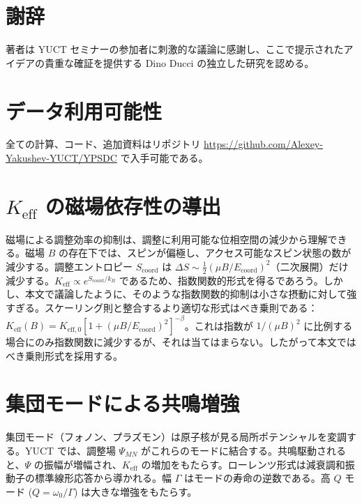 \documentclass[12pt]{article}
\newcommand{\Keff}{K_{\mathrm{eff}}}
\newcommand{\Keffzero}{K_{\mathrm{eff},0}}
\theoremstyle{remark}
\begin{document}
	\section*{謝辞}
	著者は YUCT セミナーの参加者に刺激的な議論に感謝し、ここで提示されたアイデアの貴重な確証を提供する Dino Ducci の独立した研究を認める。
	
	\section*{データ利用可能性}
	全ての計算、コード、追加資料はリポジトリ \url{https://github.com/Alexey-Yakushev-YUCT/YPSDC} で入手可能である。
	
	\appendix
	\section{\(\Keff\) の磁場依存性の導出}
	\label{app:B}
	
	磁場による調整効率の抑制は、調整に利用可能な位相空間の減少から理解できる。磁場 \(B\) の存在下では、スピンが偏極し、アクセス可能なスピン状態の数が減少する。調整エントロピー \(S_{\text{coord}}\) は \(\Delta S \sim \frac{1}{2} (\mu B / E_{\mathrm{coord}})^2\)（二次展開）だけ減少する。\(\Keff \propto e^{S_{\text{coord}}/k_B}\) であるため、指数関数的形式を得るであろう。しかし、本文で議論したように、そのような指数関数的抑制は小さな摂動に対して強すぎる。スケーリング則と整合するより適切な形式はべき乗則である：\(\Keff(B) = \Keffzero [1 + (\mu B/E_{\mathrm{coord}})^2]^{-\beta}\)。これは指数が \(1/(\mu B)^2\) に比例する場合にのみ指数関数に減少するが、それは当てはまらない。したがって本文ではべき乗則形式を採用する。
	
	\section{集団モードによる共鳴増強}
	\label{app:resonance}
	
	集団モード（フォノン、プラズモン）は原子核が見る局所ポテンシャルを変調する。YUCT では、調整場 \(\Psi_{MN}\) がこれらのモードに結合する。共鳴駆動されると、\(\Psi\) の振幅が増幅され、\(\Keff\) の増加をもたらす。ローレンツ形式は減衰調和振動子の標準線形応答から導かれる。幅 \(\Gamma\) はモードの寿命の逆数である。高 \(Q\) モード (\(Q = \omega_0/\Gamma\)) は大きな増強をもたらす。
	
\end{document}
